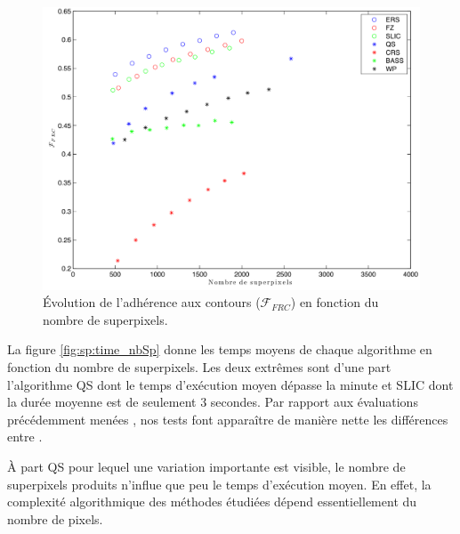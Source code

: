 \begin{figure}[htb]
	\centering	
			\includegraphics[width=\textwidth]{images/sur-segmentation/fbr_NbSp}
		 	\caption{Évolution de l'adhérence aux contours ($\mathcal{F}_{FRC}$) en fonction du nombre de superpixels.}
		 	\label{fig:sp:fbr_nbSp}
\end{figure}

La figure \ref{fig:sp:time_nbSp} donne les temps  moyens de chaque algorithme en fonction du nombre de superpixels.  Les deux extrêmes sont\modif{,} d'une part\modif{,} l'algorithme QS dont le temps d'exécution moyen dépasse la minute et SLIC dont la durée moyenne est de seulement $3$ secondes. Par rapport aux évaluations précédemment menées \cite{achanta2012slic, stutz2015superpixel}, nos tests font apparaître de manière nette les différences entre . 

À part QS pour lequel une variation importante est visible, le nombre de superpixels produits n'influe que peu le temps d'exécution moyen. En effet, la complexité algorithmique des méthodes étudiées dépend essentiellement du nombre de pixels. 

